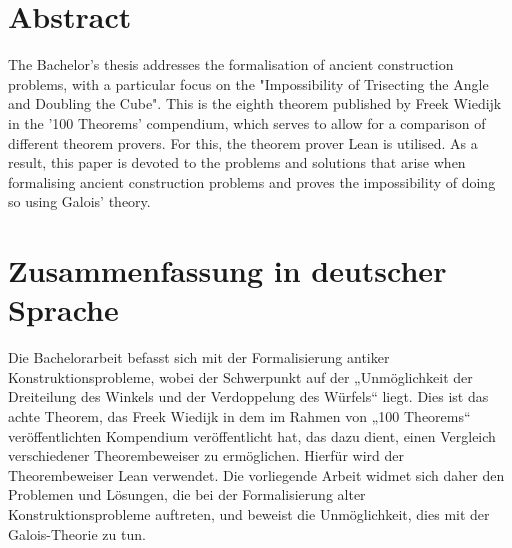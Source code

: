 \section*{Abstract}
The Bachelor's thesis addresses the formalisation of ancient construction problems, with a particular focus on the "Impossibility of Trisecting the Angle and Doubling the Cube". 
This is the eighth theorem published by Freek Wiedijk in the '100 Theorems' compendium, which serves to allow for a comparison of different theorem provers. 
For this, the theorem prover Lean is utilised. As a result, this paper is devoted to the problems and solutions that arise when formalising ancient construction problems and proves the impossibility of doing so using Galois' theory.
\section*{Zusammenfassung in deutscher Sprache}
Die Bachelorarbeit befasst sich mit der Formalisierung antiker Konstruktionsprobleme, wobei der Schwerpunkt auf der „Unmöglichkeit der Dreiteilung des Winkels und der Verdoppelung des Würfels“ liegt. 
Dies ist das achte Theorem, das Freek Wiedijk in dem im Rahmen von „100 Theorems“ veröffentlichten Kompendium veröffentlicht hat, das dazu dient, einen Vergleich verschiedener Theorembeweiser zu ermöglichen. 
Hierfür wird der Theorembeweiser Lean verwendet. Die vorliegende Arbeit widmet sich daher den Problemen und Lösungen, die bei der Formalisierung alter Konstruktionsprobleme auftreten, und beweist die Unmöglichkeit, dies mit der Galois-Theorie zu tun.